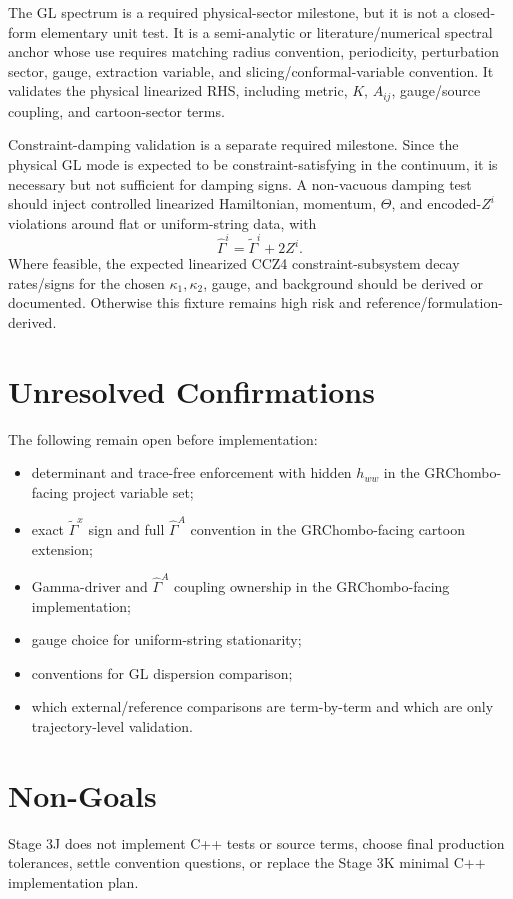 \documentclass[11pt]{article}
\begin{document}
The GL spectrum is a required physical-sector milestone, but it is not a
closed-form elementary unit test. It is a semi-analytic or literature/numerical
spectral anchor whose use requires matching radius convention, periodicity,
perturbation sector, gauge, extraction variable, and slicing/conformal-variable
convention. It validates the physical linearized RHS, including metric,
\(K\), \(A_{ij}\), gauge/source coupling, and cartoon-sector terms.

Constraint-damping validation is a separate required milestone. Since the
physical GL mode is expected to be constraint-satisfying in the continuum, it is
necessary but not sufficient for damping signs. A non-vacuous damping test
should inject controlled linearized Hamiltonian, momentum, \(\Theta\), and
encoded-\(Z^i\) violations around flat or uniform-string data, with
\[
  \hat{\Gamma}^i=\tilde{\Gamma}^i+2Z^i.
\]
Where feasible, the expected linearized CCZ4 constraint-subsystem decay
rates/signs for the chosen \(\kappa_1,\kappa_2\), gauge, and background should
be derived or documented. Otherwise this fixture remains high risk and
reference/formulation-derived.

\section{Unresolved Confirmations}

The following remain open before implementation:

\begin{itemize}[leftmargin=2em]
\item determinant and trace-free enforcement with hidden \(h_{ww}\) in the
  GRChombo-facing project variable set;
\item exact \(\tilde{\Gamma}^{x}\) sign and full \(\hat{\Gamma}^{A}\)
  convention in the GRChombo-facing cartoon extension;
\item Gamma-driver and \(\hat{\Gamma}^{A}\) coupling ownership in the
  GRChombo-facing implementation;
\item gauge choice for uniform-string stationarity;
\item conventions for GL dispersion comparison;
\item which external/reference comparisons are term-by-term and which are only
  trajectory-level validation.
\end{itemize}

\section{Non-Goals}

Stage 3J does not implement C++ tests or source terms, choose final production
tolerances, settle convention questions, or replace the Stage 3K minimal C++
implementation plan.
\end{document}
